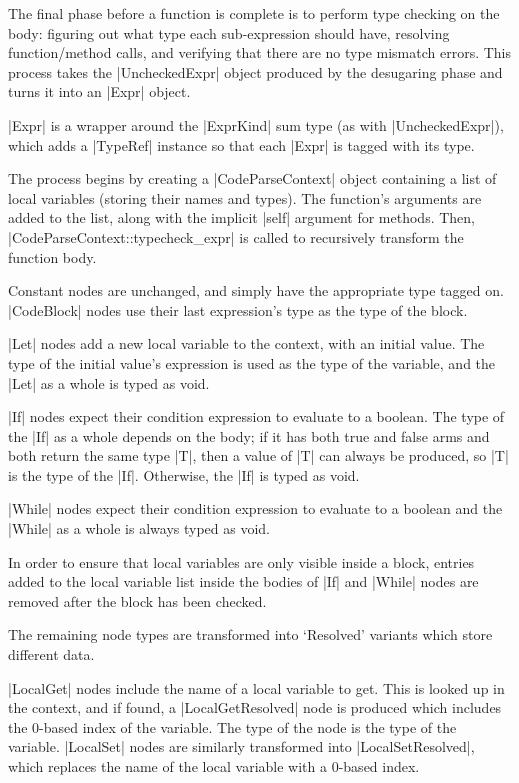 \documentclass[11pt]{report}
\begin{document}
The final phase before a function is complete is to perform type checking on the body: figuring out what type each sub-expression should have, resolving function/method calls, and verifying that there are no type mismatch errors. This process takes the |UncheckedExpr| object produced by the desugaring phase and turns it into an |Expr| object.

|Expr| is a wrapper around the |ExprKind| sum type (as with |UncheckedExpr|), which adds a |TypeRef| instance so that each |Expr| is tagged with its type.

The process begins by creating a |CodeParseContext| object containing a list of local variables (storing their names and types). The function's arguments are added to the list, along with the implicit |self| argument for methods. Then, |CodeParseContext::typecheck_expr| is called to recursively transform the function body.

Constant nodes are unchanged, and simply have the appropriate type tagged on. |CodeBlock| nodes use their last expression's type as the type of the block.

|Let| nodes add a new local variable to the context, with an initial value. The type of the initial value's expression is used as the type of the variable, and the |Let| as a whole is typed as void.

|If| nodes expect their condition expression to evaluate to a boolean. The type of the |If| as a whole depends on the body; if it has both true and false arms and both return the same type |T|, then a value of |T| can always be produced, so |T| is the type of the |If|. Otherwise, the |If| is typed as void.

|While| nodes expect their condition expression to evaluate to a boolean and the |While| as a whole is always typed as void.

In order to ensure that local variables are only visible inside a block, entries added to the local variable list inside the bodies of |If| and |While| nodes are removed after the block has been checked.

The remaining node types are transformed into `Resolved' variants which store different data.

|LocalGet| nodes include the name of a local variable to get. This is looked up in the context, and if found, a |LocalGetResolved| node is produced which includes the 0-based index of the variable. The type of the node is the type of the variable. |LocalSet| nodes are similarly transformed into |LocalSetResolved|, which replaces the name of the local variable with a 0-based index.
\end{document}

